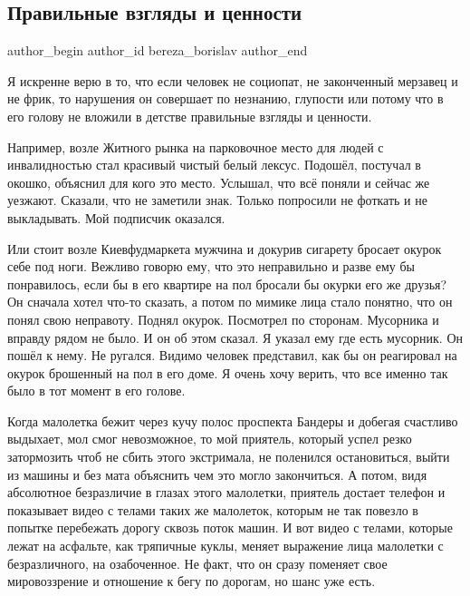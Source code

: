  
 
 
 
 
 
\subsection{Правильные взгляды и ценности}
\label{sec:23_01_2022.fb.bereza_borislav.1.pravilnye_vzgljady_i_cennosti}
 
\ifcmt
 author_begin
   author_id bereza_borislav
 author_end
\fi

Я искренне верю в то, что если человек не социопат, не законченный мерзавец и
не фрик, то нарушения он совершает по незнанию, глупости или потому что в его
голову не вложили в детстве правильные взгляды и ценности. 

Например, возле Житного рынка на парковочное место для людей с инвалидностью
стал красивый чистый белый лексус. Подошёл, постучал в окошко, объяснил для
кого это место. Услышал, что всё поняли и сейчас же уезжают. Сказали, что не
заметили знак. Только попросили не фоткать и не выкладывать. Мой подписчик
оказался. 

Или стоит возле Киевфудмаркета мужчина и докурив сигарету бросает окурок себе
под ноги. Вежливо говорю ему, что это неправильно и разве ему бы понравилось,
если бы в его квартире на пол бросали бы окурки его же друзья? Он сначала хотел
что-то сказать, а потом по мимике лица стало понятно, что он понял свою
неправоту. Поднял окурок. Посмотрел по сторонам. Мусорника и вправду рядом не
было. И он об этом сказал. Я указал ему где есть мусорник. Он пошёл к нему. Не
ругался. Видимо человек представил,  как бы он реагировал на окурок брошенный
на пол в его доме. Я очень хочу верить, что все именно так было в тот момент в
его голове. 

Когда малолетка бежит через кучу полос проспекта Бандеры и добегая счастливо
выдыхает, мол смог невозможное, то мой приятель, который успел резко
затормозить чтоб не сбить этого экстримала, не поленился остановиться, выйти из
машины и без мата объяснить чем это могло закончиться. А потом, видя абсолютное
безразличие в глазах этого малолетки, приятель достает телефон и показывает
видео с телами таких же малолеток, которым не так повезло в попытке перебежать
дорогу сквозь поток машин. И вот видео с телами, которые лежат на асфальте, как
тряпичные куклы, меняет выражение лица малолетки с безразличного, на
озабоченное. Не факт, что он сразу поменяет свое мировоззрение и отношение к
бегу по дорогам, но шанс уже есть. 


